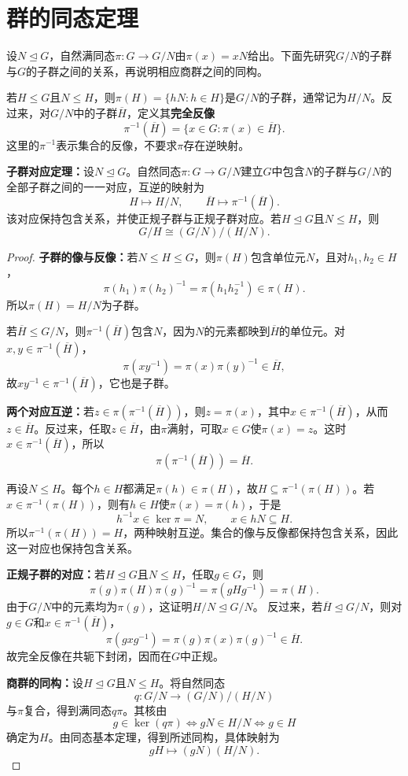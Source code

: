 \section{群的同态定理}

设$N\trianglelefteq G$，自然满同态$\pi:G\to G/N$由$\pi(x)=xN$给出。下面先研究$G/N$的子群与$G$的子群之间的关系，再说明相应商群之间的同构。

若$H\leq G$且$N\leq H$，则$\pi(H)=\{hN:h\in H\}$是$G/N$的子群，通常记为$H/N$。反过来，对$G/N$中的子群$\overline H$，定义其\textbf{完全反像}
\[
\pi^{-1}(\overline H)=\{x\in G:\pi(x)\in\overline H\}.
\]
这里的$\pi^{-1}$表示集合的反像，不要求$\pi$存在逆映射。

\begin{theorem}\label{p2:correspondence}
\textbf{子群对应定理：}设$N\trianglelefteq G$。自然同态$\pi:G\to G/N$建立$G$中包含$N$的子群与$G/N$的全部子群之间的一一对应，互逆的映射为
\[
H\longmapsto H/N,\qquad
\overline H\longmapsto\pi^{-1}(\overline H).
\]
该对应保持包含关系，并使正规子群与正规子群对应。若$H\trianglelefteq G$且$N\leq H$，则
\[
G/H\cong(G/N)/(H/N).
\]
\end{theorem}
\begin{proof}
\textbf{子群的像与反像：}若$N\leq H\leq G$，则$\pi(H)$包含单位元$N$，且对$h_1,h_2\in H$，
\[
\pi(h_1)\pi(h_2)^{-1}=\pi(h_1h_2^{-1})\in\pi(H).
\]
所以$\pi(H)=H/N$为子群。

若$\overline H\leq G/N$，则$\pi^{-1}(\overline H)$包含$N$，因为$N$的元素都映到$\overline H$的单位元。对$x,y\in\pi^{-1}(\overline H)$，
\[
\pi(xy^{-1})=\pi(x)\pi(y)^{-1}\in\overline H,
\]
故$xy^{-1}\in\pi^{-1}(\overline H)$，它也是子群。

\textbf{两个对应互逆：}若$z\in\pi(\pi^{-1}(\overline H))$，则$z=\pi(x)$，其中$x\in\pi^{-1}(\overline H)$，从而$z\in\overline H$。反过来，任取$z\in\overline H$，由$\pi$满射，可取$x\in G$使$\pi(x)=z$。这时$x\in\pi^{-1}(\overline H)$，所以
\[
\pi(\pi^{-1}(\overline H))=\overline H.
\]

再设$N\leq H$。每个$h\in H$都满足$\pi(h)\in\pi(H)$，故$H\subseteq\pi^{-1}(\pi(H))$。若$x\in\pi^{-1}(\pi(H))$，则有$h\in H$使$\pi(x)=\pi(h)$，于是
\[
h^{-1}x\in\ker\pi=N,\qquad x\in hN\subseteq H.
\]
所以$\pi^{-1}(\pi(H))=H$，两种映射互逆。集合的像与反像都保持包含关系，因此这一对应也保持包含关系。

\textbf{正规子群的对应：}若$H\trianglelefteq G$且$N\leq H$，任取$g\in G$，则
\[
\pi(g)\pi(H)\pi(g)^{-1}=\pi(gHg^{-1})=\pi(H).
\]
由于$G/N$中的元素均为$\pi(g)$，这证明$H/N\trianglelefteq G/N$。
反过来，若$\overline H\trianglelefteq G/N$，则对$g\in G$和$x\in\pi^{-1}(\overline H)$，
\[
\pi(gxg^{-1})=\pi(g)\pi(x)\pi(g)^{-1}\in\overline H.
\]
故完全反像在共轭下封闭，因而在$G$中正规。

\textbf{商群的同构：}设$H\trianglelefteq G$且$N\leq H$。将自然同态
\[
q:G/N\longrightarrow(G/N)/(H/N)
\]
与$\pi$复合，得到满同态$q\pi$。其核由
\[
g\in\ker(q\pi)
\iff gN\in H/N
\iff g\in H
\]
确定为$H$。由同态基本定理，得到所述同构，具体映射为
\[
gH\longmapsto(gN)(H/N).
\]
\end{proof}

